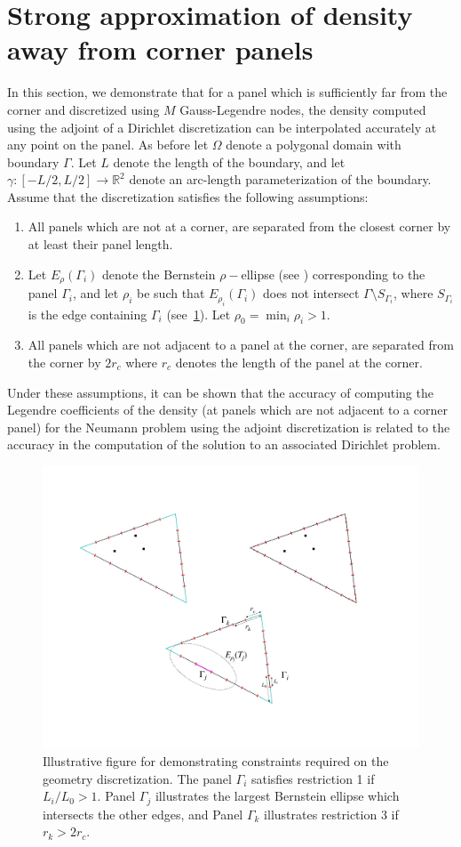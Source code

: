 \documentclass[12pt]{article}
\begin{document}
\section{Strong approximation of density away from corner panels}
\label{sec:appb}
In this section, we demonstrate that for a panel which is sufficiently far from the corner and  discretized using $M$ Gauss-Legendre nodes, the density computed using the adjoint of a Dirichlet discretization can be interpolated 
accurately at any point on the panel. As before let $\Omega$ denote a polygonal domain with boundary $\Gamma$. Let
$L$ denote the length of the boundary, and let $\gamma: [-L/2,L/2]\to \mathbb{R}^2$ denote an arc-length parameterization of the boundary.
Assume that the discretization satisfies the following assumptions:
\begin{enumerate}
\item All panels which are not at a corner, are separated from the closest corner by at least their panel length.
\item Let $E_{\rho}(\Gamma_{i})$ denote the Bernstein $\rho-$ellipse (see \cite{tref_approx}) corresponding to the panel $\Gamma_{i}$, and let $\rho_{i}$ 
be such that $E_{\rho_{i}}(\Gamma_{i})$ does not intersect $\Gamma \setminus S_{\Gamma_{i}}$, where 
$S_{\Gamma_{i}}$ is the edge containing $\Gamma_{i}$ (see~\cref{fig:illus-cons}). Let $\rho_{0} = \min_{i} \rho_{i} >1$.
\item All panels which are not adjacent to a panel at the corner, are separated from the corner by $2r_{c}$ where $r_{c}$ 
denotes the length of the panel at the corner.
\end{enumerate}
Under these assumptions, it can be shown that the accuracy of computing the
Legendre coefficients of the density (at panels which are not adjacent to a corner panel) for the Neumann problem using the adjoint discretization is related to the accuracy 
in the computation of the solution to an associated Dirichlet problem.
\begin{figure}
\begin{center}
\includegraphics[width=0.3\linewidth]{media/geom-restriction-illus}
\caption{Illustrative figure for demonstrating constraints required on the geometry discretization. The panel $\Gamma_{i}$ satisfies restriction 1 if $L_{i}/L_{0}>1$. Panel $\Gamma_{j}$ illustrates the largest Bernstein ellipse which intersects the other edges, and Panel $\Gamma_{k}$ illustrates restriction 3 if $r_{k}>2r_{c}$. }
\label{fig:illus-cons}
\end{center}
\end{figure}
\end{document}
